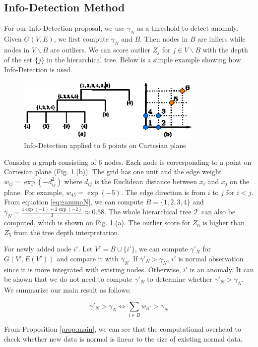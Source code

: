 \documentclass[runningheads]{llncs}
\begin{document}
\subsection{Info-Detection Method}
For our Info-Detection proposal, we use $\gamma_N$ as a threshold to detect anomaly.  Given $G(V, E)$, we first compute $\gamma_N$ and $B$. Then nodes in $B$ are inliers while nodes in $V\backslash B$  are outliers. We can score outlier $Z_j$ for $j \in V\backslash B$ with the depth of the set $\{j\}$ in the hierarchical tree. Below is a simple example showing how Info-Detection is used.
\begin{example}
	\begin{figure}[!ht]
		\centering
		\includegraphics[width=9cm]{pic/outlier_example.eps}
		\caption{Info-Detection applied to 6 points on Cartesian plane}\label{fig:ex}
	\end{figure}
	Consider a graph consisting of 6 nodes. Each node is corresponding to a point on Cartesian plane (Fig. \ref{fig:ex}.(b)). The grid has one unit and the edge weight $w_{ij} = \exp(-d_{ij}^2)$ where $d_{ij}$ is the Euclidean distance between $x_i$ and $x_j$ on the plane. For example, $w_{45} = \exp(-5)$. The edge direction is from $i$ to $j$ for $i<j$. From equation \eqref{eq:gammaN}, we can compute $B=\{1,2,3,4\}$ and $\gamma_N = \frac{4\exp(-1)+2\exp(-2)}{3}\approx 0.58$. The whole hierarchical tree $\mathcal{T}$ can also be computed, which is shown on Fig. \ref{fig:ex}.(a). The outlier score for $Z_6$ is higher than $Z_5$ from the tree depth interpretation.
\end{example}


For newly added node $i'$. Let $V'=B\cup \{i'\}$, we can compute $\gamma'_N$ for $G(V', E(V'))$ and compare it with $\gamma_N$. If $\gamma'_N>\gamma_N$, $i'$ is normal observation since it is more integrated with existing nodes. Otherwise, $i'$ is an anomaly. It can be shown that we do not need to compute $\gamma'_N$ to determine whether $\gamma'_N>\gamma_N$. We summarize our main result as follows:
\begin{proposition}\label{prop:main}
\begin{equation}
\gamma'_N > \gamma_N \iff  \sum_{i \in B} w_{ii'} > \gamma_N 
\end{equation}
\end{proposition}
From Proposition \ref{prop:main}, we can see that the computational overhead to check whether new data is normal is linear to the size of existing normal data. 
\end{document}
